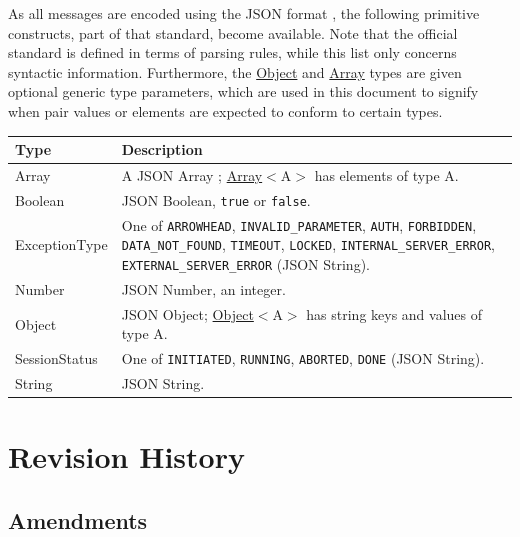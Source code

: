 \documentclass[a4paper]{arrowhead}
\newcommand{\pdef}[1]{{\textcolor{ArrowheadGrey}{#1 \label{sec:model:primitives:#1} \label{sec:model:primitives:#1s}}}}
\newcommand{\pref}[1]{{\textcolor{ArrowheadGrey}{\hyperref[sec:model:primitives:#1]{#1}}}}
\begin{document}
As all messages are encoded using the JSON format \cite{rfc8259}, the following primitive constructs, part of that standard, become available.
Note that the official standard is defined in terms of parsing rules, while this list only concerns syntactic information.
Furthermore, the \pref{Object} and \pref{Array} types are given optional generic type parameters, which are used in this document to signify when pair values or elements are expected to conform to certain types.

\noindent\begin{tabularx}{\textwidth}{| p{4.6cm} | X |} \hline
\rowcolor{gray!33} Type & Description \\ \hline
\pdef{Array} & A JSON Array \cite{rfc8259}; \pref{Array}$<$A$>$ has elements of type A. \\ \hline
\pdef{Boolean} & JSON Boolean, \texttt{true} or \texttt{false}. \\ \hline
\pdef{ExceptionType} & One of \texttt{ARROWHEAD}, \texttt{INVALID\_\allowbreak{}PARAMETER}, \texttt{AUTH}, \texttt{FORBIDDEN}, \texttt{DATA\_\allowbreak{}NOT\_\allowbreak{}FOUND}, \texttt{TIMEOUT}, \texttt{LOCKED}, \texttt{INTERNAL\_\allowbreak{}SERVER\_\allowbreak{}ERROR}, \texttt{EXTERNAL\_\allowbreak{}SERVER\_\allowbreak{}ERROR} (JSON String). \\ \hline
\pdef{Number} & JSON Number, an integer. \\ \hline
\pdef{Object} & JSON Object; \pref{Object}$<$A$>$ has string keys and values of type A. \\ \hline
\pdef{SessionStatus} & One of \texttt{INITIATED}, \texttt{RUNNING}, \texttt{ABORTED}, \texttt{DONE} (JSON String). \\ \hline
\pdef{String} & JSON String. \\ \hline
\end{tabularx}

\newpage




\newpage

\section{Revision History}
\subsection{Amendments}
\end{document}
